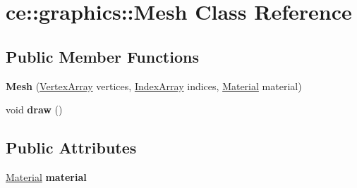 \hypertarget{classce_1_1graphics_1_1_mesh}{}\section{ce\+:\+:graphics\+:\+:Mesh Class Reference}
\label{classce_1_1graphics_1_1_mesh}
\subsection*{Public Member Functions}
\begin{DoxyCompactItemize}
\item 
\mbox{\label{classce_1_1graphics_1_1_mesh_a5069371e754447217960efdf27f89069}} 
{\bfseries Mesh} (\hyperlink{_vertex_8h_a72d0effc290681342d1fc2b5fffa6aef}{Vertex\+Array} vertices, \hyperlink{_vertex_8h_a25b1e42db1e356e8bfc3ab61ade25040}{Index\+Array} indices, \hyperlink{structce_1_1graphics_1_1_material}{Material} material)
\item 
\mbox{\label{classce_1_1graphics_1_1_mesh_a4c056e83554a4face474bbc21d309910}} 
void {\bfseries draw} ()
\end{DoxyCompactItemize}
\subsection*{Public Attributes}
\begin{DoxyCompactItemize}
\item 
\mbox{\label{classce_1_1graphics_1_1_mesh_ae10e3d9449f7af5b17644b94d2d4e396}} 
\hyperlink{structce_1_1graphics_1_1_material}{Material} {\bfseries material}
\end{DoxyCompactItemize}
